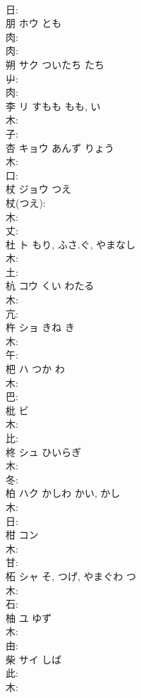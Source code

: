 \documentclass[8pt]{extreport}
\begin{document}
\begin{CJK}{UTF8}{min}
\\	日: 
\\	朋	ホウ	とも		
\\	肉: 
\\	肉: 
\\	朔	サク	ついたち	たち	
\\	屮: 
\\	肉: 
\\	李	リ	すもも	もも, い	
\\	木: 
\\	子: 
\\	杏	キョウ	あんず	りょう	
\\	木: 
\\	口: 
\\	杖	ジョウ	つえ		
\\	杖(つえ): 
\\	木: 
\\	丈: 
\\	杜	ト	もり, ふさ.ぐ, やまなし		
\\	木: 
\\	土: 
\\	杭	コウ	くい	わたる	
\\	木: 
\\	亢: 
\\	杵	ショ	きね	き	
\\	木: 
\\	午: 
\\	杷	ハ	つか	わ	
\\	木: 
\\	巴: 
\\	枇	ビ			
\\	木: 
\\	比: 
\\	柊	シュ	ひいらぎ		
\\	木: 
\\	冬: 
\\	柏	ハク	かしわ	かい, かし	
\\	木: 
\\	日: 
\\	柑	コン			
\\	木: 
\\	甘: 
\\	柘	シャ	そ, つげ, やまぐわ	つ	
\\	木: 
\\	石: 
\\	柚	ユ	ゆず		
\\	木: 
\\	由: 
\\	柴	サイ	しば		
\\	此: 
\\	木: 

\end{CJK}
\end{document}
